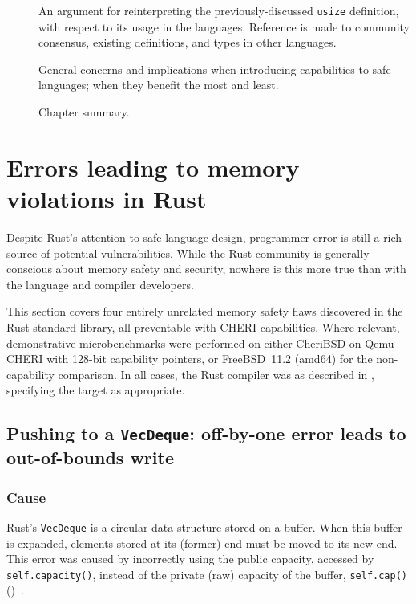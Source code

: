 \documentclass[dissertation.tex]{subfiles}
\begin{document}
\begin{description}
    \item[]
    An argument for reinterpreting the previously-discussed
    \texttt{usize} definition, with respect to its usage in the
    languages.
    Reference is made to community consensus, existing definitions, and
    types in other languages.

    \item[]
    General concerns and implications when introducing capabilities to
    safe languages; when they benefit the most and least.

    \item[] Chapter summary.
\end{description}


\section{Errors leading to memory violations in Rust}
\label{sec:eval-bugs}

Despite Rust's attention to safe language design, programmer error is
still a rich source of potential vulnerabilities.
While the Rust community is generally conscious about memory safety and
security, nowhere is this more true than with the language and compiler
developers.

This section covers four entirely unrelated memory safety flaws
discovered in the Rust standard library, all preventable with CHERI
capabilities.
Where relevant, demonstrative microbenchmarks were performed on either
CheriBSD on Qemu-CHERI with 128-bit capability pointers, or FreeBSD~11.2
(amd64) for the non-capability comparison.
In all cases, the Rust compiler was as described in
, specifying the target as appropriate.


\subsection{Pushing to a \texttt{VecDeque}: off-by-one error leads to out-of-bounds write}
\label{sec:eval-micro-push}

\subsubsection{Cause}
Rust's \texttt{VecDeque} is a circular data structure stored on a
buffer.
When this buffer is expanded, elements stored at its (former) end must
be moved to its new end.
This error was caused by incorrectly using the public capacity, accessed
by \texttt{self.capacity()}, instead of the private (raw) capacity of
the buffer, \texttt{self.cap()}
()~\cite{rust-pr-reserve,rust-issue-deque-append}.
\end{document}
